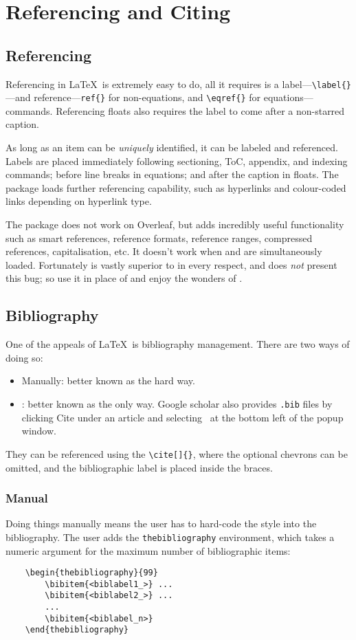\chapter{Referencing and Citing}
\section{Referencing}
%
Referencing in \LaTeX~is extremely easy to do, all it requires is a
label---\verb|\label{}|---and reference---\verb|ref{}| for
non-equations, and \verb|\eqref{}| for equations---commands.
Referencing floats also requires the label to come after a non-starred
caption.

As long as an item can be \emph{uniquely} identified, it can be
labeled and referenced.  Labels are placed immediately following
sectioning, ToC, appendix, and indexing commands; before line breaks
in equations; and after the caption in floats.  The 
package loads further referencing capability, such as hyperlinks and
colour-coded links depending on hyperlink type.

The package  does not work on Overleaf, but adds
incredibly useful functionality such as smart references, reference
formats, reference ranges, compressed references, capitalisation, etc.
It doesn't work when  and  are
simultaneously loaded.  Fortunately  is vastly superior
to  in every respect, and does \emph{not} present this
bug; so use it in place of  and enjoy the wonders of
.
%
\section{Bibliography}
%
One of the appeals of \LaTeX~is bibliography management.  There are
two ways of doing so:
\begin{itemize}
    \item Manually: better known as the hard way.
    \item \BibTeX: better known as the only way.  Google scholar also
      provides \texttt{.bib} files by clicking Cite under an article
      and selecting \BibTeX~at the bottom left of the popup window.
\end{itemize}
They can be referenced using the \verb|\cite[]{}|, where the optional
chevrons can be omitted, and the bibliographic label is placed inside
the braces.
%
\subsection{Manual}
%
Doing things manually means the user has to hard-code the style into
the bibliography.  The user adds the \verb|thebibliography|
environment, which takes a numeric argument for the maximum number of
bibliographic items:
\begin{verbatim}
	\begin{thebibliography}{99}
	    \bibitem{<biblabel1_>} ...
	    \bibitem{<biblabel2_>} ...
	    ...
	    \bibitem{<biblabel_n>}
	\end{thebibliography}
\end{verbatim}
%
